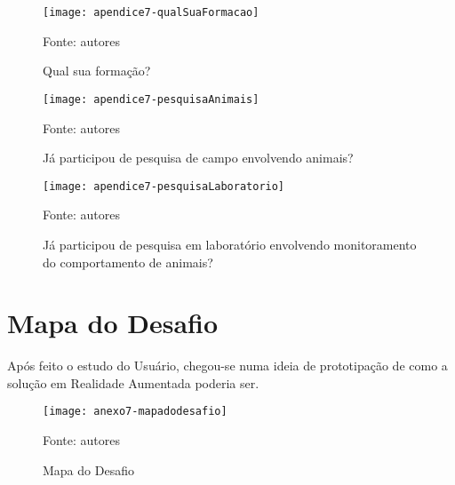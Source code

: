 \begin{figure}[ht]
  \centering
    \caption{Qual sua formação?}
    \texttt{[image: apendice7-qualSuaFormacao]}
	\centerline{\small{Fonte: autores}}
\end{figure}
\FloatBarrier

\begin{figure}[ht]
  \centering
    \caption{Já participou de pesquisa de campo envolvendo animais?}
    \texttt{[image: apendice7-pesquisaAnimais]}
	\centerline{\small{Fonte: autores}}
\end{figure}
\FloatBarrier

\begin{figure}[ht]
  \centering
    \caption{Já participou de pesquisa em laboratório envolvendo monitoramento do comportamento de animais?}
    \texttt{[image: apendice7-pesquisaLaboratorio]}
	\centerline{\small{Fonte: autores}}
\end{figure}
\FloatBarrier

\section{Mapa do Desafio}

Após feito o estudo do Usuário, chegou-se numa ideia de prototipação de como a solução em Realidade Aumentada poderia ser. 

\begin{sidewaysfigure}[ht]
  \centering
    \caption{Mapa do Desafio}
    \texttt{[image: anexo7-mapadodesafio]}
	\centerline{\small{Fonte: autores}}
\end{sidewaysfigure}
\FloatBarrier